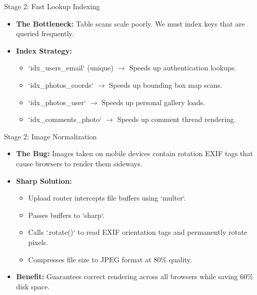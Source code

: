\documentclass[aspectratio=169]{beamer}
\begin{document}
\begin{frame}{Stage 2: Fast Lookup Indexing}
  \begin{itemize}
    \item \textbf{The Bottleneck:} Table scans scale poorly. We must index keys that are queried frequently.
    \item \textbf{Index Strategy:}
      \begin{itemize}
        \item `idx_users_email` (unique) $\to$ Speeds up authentication lookups.
        \item `idx_photos_coords` $\to$ Speeds up bounding box map scans.
        \item `idx_photos_user` $\to$ Speeds up personal gallery loads.
        \item `idx_comments_photo` $\to$ Speeds up comment thread rendering.
      \end{itemize}
  \end{itemize}
\end{frame}

\begin{frame}{Stage 2: Image Normalization}
  \begin{itemize}
    \item \textbf{The Bug:} Images taken on mobile devices contain rotation EXIF tags that cause browsers to render them sideways.
    \item \textbf{Sharp Solution:}
      \begin{itemize}
        \item Upload router intercepts file buffers using `multer`.
        \item Passes buffers to `sharp`.
        \item Calls `.rotate()` to read EXIF orientation tags and permanently rotate pixels.
        \item Compresses file size to JPEG format at $80\%$ quality.
      \end{itemize}
    \item \textbf{Benefit:} Guarantees correct rendering across all browsers while saving $60\%$ disk space.
  \end{itemize}
\end{frame}
\end{document}
